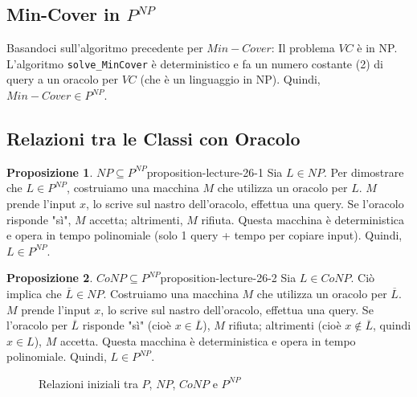\documentclass[a4paper]{article}
\theoremstyle{definition} %
\newtheorem{proposition}{Proposizione}
\begin{document}
\subsection{Min-Cover in $P^{NP}$}
Basandoci sull'algoritmo precedente per $Min-Cover$:
Il problema $VC$ è in NP. L'algoritmo \texttt{solve\_MinCover} è deterministico e fa un numero costante (2) di query a un oracolo per $VC$ (che è un linguaggio in NP).
Quindi, $Min-Cover \in P^{NP}$.

\subsection{Relazioni tra le Classi con Oracolo}
\begin{proposition}{$NP \subseteq P^{NP}$}{proposition-lecture-26-1}
Sia $L \in NP$. Per dimostrare che $L \in P^{NP}$, costruiamo una macchina $M$ che utilizza un oracolo per $L$. $M$ prende l'input $x$, lo scrive sul nastro dell'oracolo, effettua una query. Se l'oracolo risponde "sì", $M$ accetta; altrimenti, $M$ rifiuta. Questa macchina è deterministica e opera in tempo polinomiale (solo 1 query + tempo per copiare input). Quindi, $L \in P^{NP}$.
\end{proposition}

\begin{proposition}{$CoNP \subseteq P^{NP}$}{proposition-lecture-26-2}
Sia $L \in CoNP$. Ciò implica che $\overline{L} \in NP$. Costruiamo una macchina $M$ che utilizza un oracolo per $\overline{L}$. $M$ prende l'input $x$, lo scrive sul nastro dell'oracolo, effettua una query. Se l'oracolo per $\overline{L}$ risponde "sì" (cioè $x \in \overline{L}$), $M$ rifiuta; altrimenti (cioè $x \notin \overline{L}$, quindi $x \in L$), $M$ accetta. Questa macchina è deterministica e opera in tempo polinomiale. Quindi, $L \in P^{NP}$.
\end{proposition}

\begin{figure}[h]
    \centering
    \caption{Relazioni iniziali tra $P$, $NP$, $CoNP$ e $P^{NP}$}
\end{figure}
\end{document}
